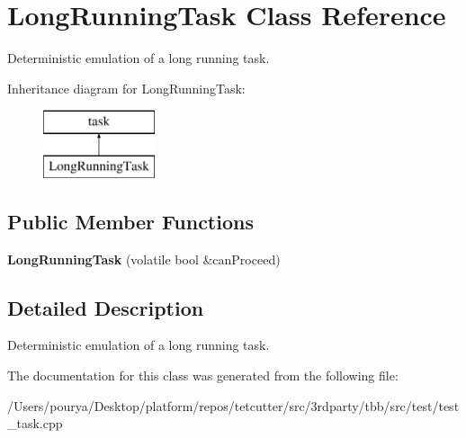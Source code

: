 \hypertarget{classLongRunningTask}{}\section{Long\+Running\+Task Class Reference}
\label{classLongRunningTask}


Deterministic emulation of a long running task.  


Inheritance diagram for Long\+Running\+Task\+:\begin{figure}[H]
\begin{center}
\leavevmode
\includegraphics[height=2.000000cm]{classLongRunningTask}
\end{center}
\end{figure}
\subsection*{Public Member Functions}
\begin{DoxyCompactItemize}
\item 
\hypertarget{classLongRunningTask_a4988ac804d6522299d43fec440bf24d2}{}{\bfseries Long\+Running\+Task} (volatile bool \&can\+Proceed)\label{classLongRunningTask_a4988ac804d6522299d43fec440bf24d2}

\end{DoxyCompactItemize}


\subsection{Detailed Description}
Deterministic emulation of a long running task. 

The documentation for this class was generated from the following file\+:\begin{DoxyCompactItemize}
\item 
/\+Users/pourya/\+Desktop/platform/repos/tetcutter/src/3rdparty/tbb/src/test/test\+\_\+task.\+cpp\end{DoxyCompactItemize}

